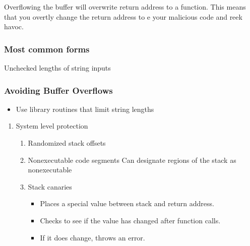 \documentclass[11pt]{article}
\begin{document}
Overflowing the buffer will overwrite return address to a function. This means that you overtly change the return 
address to e your malicious code and reek havoc.
\subsubsection{Most common forms}
\label{sec-10-1-1}
Unchecked lengths of string inputs
\subsubsection{Avoiding Buffer Overflows}
\label{sec-10-1-2}
\begin{itemize}
\item Use library routines that limit string lengths
\end{itemize}
\begin{enumerate}
\item System level protection
\label{sec-10-1-2-1}
\begin{enumerate}
\item Randomized stack offsets
\label{sec-10-1-2-1-1}
\item Nonexecutable code segments
\label{sec-10-1-2-1-2}
Can designate regions of the stack as nonexecutable 
\item Stack canaries
\label{sec-10-1-2-1-3}
\begin{itemize}
\item Places a special value between stack and return address.
\item Checks to see if the value has changed after function calls.
\item If it does change, throws an error.
\end{itemize}
\end{enumerate}
\end{enumerate}
\end{document}
